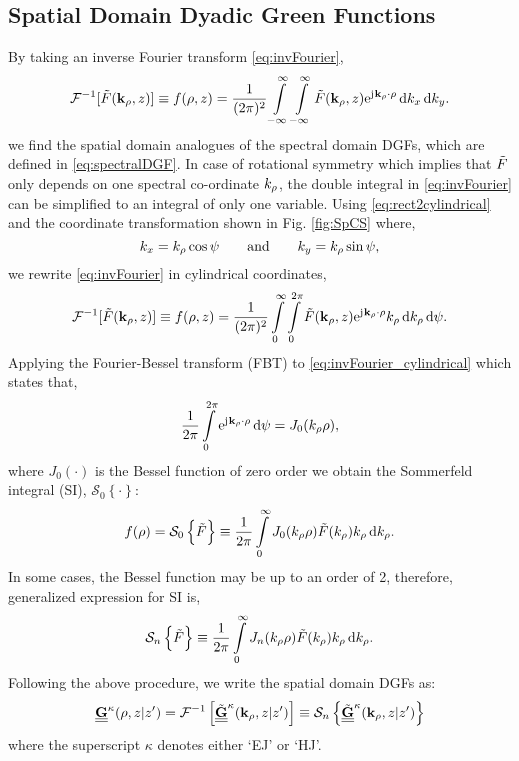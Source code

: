 \documentclass[12pt]{article}
\begin{document}
\subsection{Spatial Domain Dyadic Green Functions}
%
By taking an inverse Fourier transform \eqref{eq:invFourier},
%
\begin{equation}
  \mathcal{F}^{-1}[\tilde{F}(\mathbf{k}_{\rho},z)] \equiv f(\mathbf{\rho},z) = \frac{1}{(2 \pi )^2}\int\limits_{-\infty}^\infty \int\limits_{-\infty}^\infty
  \tilde{F}(\mathbf{k}_{\rho},z) \mathrm{e}^{\mathrm{j}\mkern1mu \mathbf{k}_{\rho} \cdot \mathbf{\rho}} \mathop{}\!\mathrm{d}{k_x} \mathop{}\!\mathrm{d}{k_y}.
  \label{eq:invFourier}
\end{equation}
%
we find the spatial domain analogues of the spectral domain DGFs, which are  defined in \eqref{eq:spectralDGF}. In case of rotational symmetry which implies that $\tilde{F}$ only depends on one spectral co-ordinate $k_{\rho}$, the double integral in \eqref{eq:invFourier} can be simplified to an integral of only one variable. Using  \eqref{eq:rect2cylindrical} and the coordinate transformation shown in Fig. \ref{fig:SpCS} where,
%
\begin{equation}
    k_x = k_{\p} \cos \psi \qquad \text{and} \qquad
    k_y = k_{\p} \sin \psi,
  \label{eq:cylindricaltransformation}%
\end{equation}
we rewrite \eqref{eq:invFourier} in cylindrical coordinates,
%
\begin{equation}
  \mathcal{F}^{-1} [\tilde{F}(\mathbf{k}_{\rho},z)] \equiv f(\mathbf{\rho},z) = \frac{1}{(2\pi)^2} \int\limits_0^{\infty} \int\limits_0^{2\pi}
  \tilde{F}(\mathbf{k}_{\rho},z) \mathrm{e}^{\mathrm{j}\mkern1mu \mathbf{k}_{\rho} \cdot \mathbf{\rho}} k_{\rho} \mathop{}\!\mathrm{d}{k_{\rho}} \mathop{}\!\mathrm{d}{\psi}.
  \label{eq:invFourier_cylindrical}
\end{equation}
%
Applying the Fourier-Bessel transform (FBT) to \eqref{eq:invFourier_cylindrical} which states that,
\begin{equation}
  \frac{1}{2\pi}\int\limits_0^{2\pi}
  \mathrm{e}^{\mathrm{j}\mkern1mu \mathbf{k}_{\rho} \cdot \mathbf{\rho}} \mathop{}\!\mathrm{d}{\psi} = J_0(k_{\rho}\rho),
  \label{eq:hankel_transofrm}
\end{equation}
%
where $J_0(\cdot)$ is the Bessel function of zero order
we obtain the Sommerfeld integral (SI), $\mathcal{S}_0\left \{\cdot\right \}$:
%
\begin{equation}
  f(\rho) = \mathcal{S}_0\left \{\tilde{F}\right \} \equiv \frac{1}{2\pi}\int\limits_0^{\infty} J_0(k_{\rho}\rho)  \tilde{F}(k_{\rho}) k_{\rho} \mathop{}\!\mathrm{d}{k_{\rho}}.
  \label{eq:sommerfeld_integral}
\end{equation}
%
In some cases, the Bessel function may be up to an order of 2, therefore, generalized expression for SI is,
%
\begin{equation}
    \mathcal{S}_n\left \{\ti{F}\right \} \equiv \frac{1}{2\pi}\int\limits_0^{\inf} J_n(k_{\p}\p)  \ti{F}(k_{\p}) k_{\p} \diff{k_{\p}}.
  \label{eq:generalized_SI}%
\end{equation}
%
Following the above procedure, we write the spatial domain DGFs as:
%
\begin{equation}
    {\tnsr{\v {G}}^\mathrm{\kappa}}(\v {\p}, z | z') = \mathcal{F}^{-1} \left[ \ti{\tnsr{\v {G}}}^\mathrm{\kappa}(\v k_{\p}, z | z') \right]
    \equiv \mathcal{S}_n\left \{\ti{\tnsr{\v {G}}}^\mathrm{\kappa}(\v k_{\p}, z | z')\right \}
  \label{eq:spatialDGF_generalized}%
\end{equation}
%
where the superscript $\kappa$ denotes either `EJ' or `HJ'.
\end{document}
